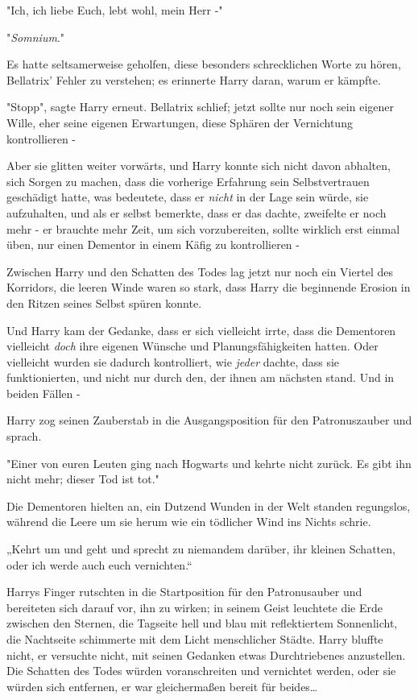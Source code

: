 {"Ich, ich liebe Euch, lebt wohl, mein Herr -"

"\emph{Somnium}."

Es hatte seltsamerweise geholfen, diese besonders schrecklichen Worte zu hören, Bellatrix' Fehler zu verstehen; es erinnerte Harry daran, warum er kämpfte.

"Stopp", sagte Harry erneut. Bellatrix schlief; jetzt sollte nur noch sein eigener Wille, eher seine eigenen Erwartungen, diese Sphären der Vernichtung kontrollieren -

Aber sie glitten weiter vorwärts, und Harry konnte sich nicht davon abhalten, sich Sorgen zu machen, dass die vorherige Erfahrung sein Selbstvertrauen geschädigt hatte, was bedeutete, dass er \emph{nicht} in der Lage sein würde, sie aufzuhalten, und als er selbst bemerkte, dass er das dachte, zweifelte er noch mehr - er brauchte mehr Zeit, um sich vorzubereiten, sollte wirklich erst einmal üben, nur einen Dementor in einem Käfig zu kontrollieren -

Zwischen Harry und den Schatten des Todes lag jetzt nur noch ein Viertel des Korridors, die leeren Winde waren so stark, dass Harry die beginnende Erosion in den Ritzen seines Selbst spüren konnte.

Und Harry kam der Gedanke, dass er sich vielleicht irrte, dass die Dementoren vielleicht \emph{doch} ihre eigenen Wünsche und Planungsfähigkeiten hatten. Oder vielleicht wurden sie dadurch kontrolliert, wie \emph{jeder} dachte, dass sie funktionierten, und nicht nur durch den, der ihnen am nächsten stand. Und in beiden Fällen -

Harry zog seinen Zauberstab in die Ausgangsposition für den Patronuszauber und sprach.

"Einer von euren Leuten ging nach Hogwarts und kehrte nicht zurück. Es gibt ihn nicht mehr; dieser Tod ist tot."

Die Dementoren hielten an, ein Dutzend Wunden in der Welt standen regungslos, während die Leere um sie herum wie ein tödlicher Wind ins Nichts schrie.

„Kehrt um und geht und sprecht zu niemandem darüber, ihr kleinen Schatten, oder ich werde auch euch vernichten.“

Harrys Finger rutschten in die Startposition für den Patronusauber und bereiteten sich darauf vor, ihn zu wirken; in seinem Geist leuchtete die Erde zwischen den Sternen, die Tagseite hell und blau mit reflektiertem Sonnenlicht, die Nachtseite schimmerte mit dem Licht menschlicher Städte. Harry bluffte nicht, er versuchte nicht, mit seinen Gedanken etwas Durchtriebenes anzustellen. Die Schatten des Todes würden voranschreiten und vernichtet werden, oder sie würden sich entfernen, er war gleichermaßen bereit für beides…

}
